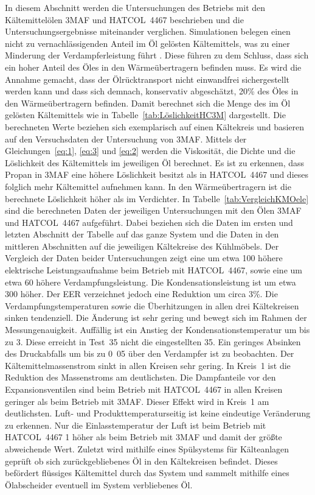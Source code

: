 In diesem Abschnitt werden die Untersuchungen des Betriebs mit den Kältemittelölen 3MAF und HATCOL~4467 beschrieben und die Untersuchungsergebnisse miteinander verglichen.
Simulationen belegen einen nicht zu vernachlässigenden Anteil im Öl gelösten Kältemittels, was zu einer Minderung der Verdampferleistung führt  \cite{Universitatpolitecnicadevalencia.2017}. Diese führen zu dem Schluss, dass sich ein hoher Anteil des Öles in den Wärmeübertragern befinden muss. Es wird die Annahme gemacht, dass der Ölrücktransport nicht einwandfrei sichergestellt werden kann und dass sich demnach, konservativ abgeschätzt, \unit{20}{\%} des Öles in den Wärmeübertragern befinden. Damit berechnet sich die Menge des im Öl gelösten Kältemittels wie in Tabelle~\ref{tab:LöslichkeitHC3M} dargestellt.
Die berechneten Werte beziehen sich exemplarisch auf einen Kältekreis und basieren auf den Versuchsdaten der Untersuchung von 3MAF.
Mittels der Gleichungen~\ref{eq:1}, \ref{eq:3} und \ref{eq:2} werden die Viskosität, die Dichte und die Löslichkeit des Kältemittels im jeweiligen Öl berechnet. Es ist zu erkennen, dass Propan in 3MAF eine höhere Löslichkeit besitzt als in HATCOL~4467 und dieses folglich mehr Kältemittel aufnehmen kann. In den Wärmeübertragern ist die berechnete Löslichkeit höher als im Verdichter. \newline
In Tabelle~\ref{tab:VergleichKMOele} sind die berechneten Daten der jeweiligen Untersuchungen mit den Ölen 3MAF und HATCOL~4467 aufgeführt. Dabei beziehen sich die Daten im ersten und letzten Abschnitt der Tabelle auf das ganze System und die Daten in den mittleren Abschnitten auf die jeweiligen Kältekreise des Kühlmöbels.
Der Vergleich der Daten beider Untersuchungen zeigt eine um etwa \unit{100}{\watt} höhere elektrische Leistungsaufnahme beim Betrieb mit HATCOL~4467, sowie eine um etwa \unit{60}{\watt} höhere Verdampfungsleistung. Die Kondensationsleistung ist um etwa \unit{300}{\watt} höher. Der EER verzeichnet jedoch eine Reduktion um circa \unit{3}{\%}. Die Verdampfungstemperaturen sowie die Überhitzungen in allen drei Kältekreisen sinken tendenziell. Die Änderung ist sehr gering und bewegt sich im Rahmen der Messungenauigkeit. \newline
Auffällig ist ein Anstieg der Kondensationstemperatur um bis zu \unit{3}{\kelvin}. Diese erreicht in Test~35 nicht die eingestellten \unit{35}{\celsius}. Ein geringes Absinken des Druckabfalls um bis zu \unit{0.05}{\bbar} über den Verdampfer ist zu beobachten. Der Kältemittelmassenstrom sinkt in allen Kreisen sehr gering. In Kreis~1 ist die Reduktion des Massenstroms am deutlichsten. Die Dampfanteile vor den Expansionsventilen sind beim Betrieb mit HATCOL~4467 in allen Kreisen geringer als beim Betrieb mit 3MAF. Dieser Effekt wird in Kreis~1 am deutlichsten. 
Luft- und Produkttemperaturseitig ist keine eindeutige Veränderung zu erkennen. 
Nur die Einlasstemperatur der Luft ist beim Betrieb mit HATCOL~4467 \unit{1}{\kelvin} höher als beim Betrieb mit 3MAF und damit der größte abweichende Wert. \newline
Zuletzt wird mithilfe eines Spülsystems für Kälteanlagen geprüft ob sich zurückgebliebenes Öl in den Kältekreisen befindet. Dieses befördert flüssiges Kältemittel durch das System und sammelt mithilfe eines Ölabscheider eventuell im System verbliebenes Öl.


